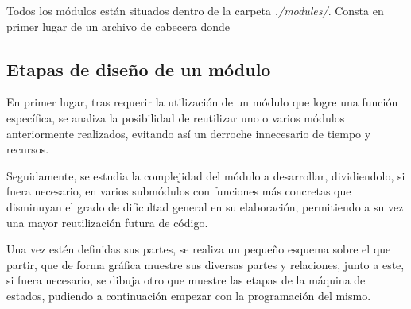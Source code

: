 Todos los módulos están situados dentro de la carpeta \emph{./modules/}. Consta en primer lugar de un archivo de cabecera donde 


\subsection{Etapas de diseño de un módulo}

En primer lugar, tras requerir la utilización de un módulo que logre una función específica, se analiza la posibilidad de reutilizar uno o varios módulos anteriormente realizados, evitando así un derroche innecesario de tiempo y recursos.

Seguidamente, se estudia la complejidad del módulo a desarrollar, dividiendolo, si fuera necesario, en varios submódulos con funciones más concretas que disminuyan el grado de dificultad general en su elaboración, permitiendo a su vez una mayor reutilización futura de código.

Una vez estén definidas sus partes, se realiza un pequeño esquema sobre el que partir, que de forma gráfica muestre sus diversas partes y relaciones, junto a este, si fuera necesario, se dibuja otro que muestre las etapas de la máquina de estados, pudiendo a continuación empezar con la programación del mismo.

